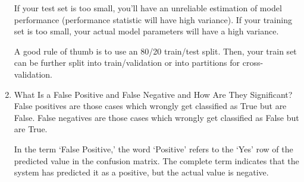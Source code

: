 \documentclass[11pt]{article}
\begin{document}
\begin{enumerate}
If your test set is too small, you'll have an unreliable estimation of model performance
(performance statistic will have high variance). If your training set is too small, your actual model
parameters will have a high variance.

A good rule of thumb is to use an 80/20 train/test split. Then, your train set can be further split
into train/validation or into partitions for cross-validation.

\item What Is a False Positive and False Negative and How Are They Significant?\\[.5em]
False positives are those cases which wrongly get classified as True but are False.
False negatives are those cases which wrongly get classified as False but are True.

In the term ‘False Positive,’ the word ‘Positive’ refers to the ‘Yes’ row of the predicted value in
the confusion matrix. The complete term indicates that the system has predicted it as a positive,
but the actual value is negative.
\end{enumerate}
\pagebreak
\end{document}
